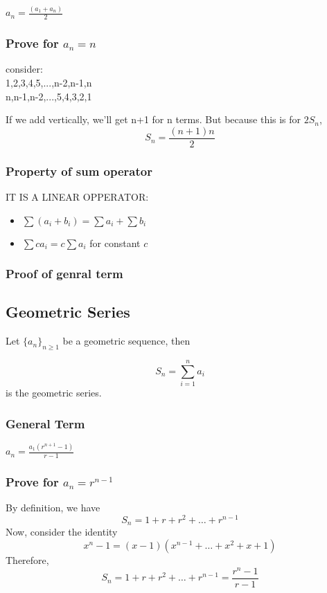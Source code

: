 \documentclass{article}
\begin{document}
$a_n = \frac{(a_1+a_n)}{2}$

\subsubsection{Prove for $a_n=n$}

consider:
\\
1,2,3,4,5,...,n-2,n-1,n\\
n,n-1,n-2,...,5,4,3,2,1

If we add vertically, we'll get n+1 for n terms.
But because this is for $2S_n$, $$S_n=\frac{(n+1)n}{2}$$

\subsubsection{Property of sum operator}

IT IS A LINEAR OPPERATOR:

\begin{itemize}
    \item $\sum (a_i+b_i) = \sum a_i + \sum b_i$
    \item $\sum ca_i = c \sum a_i$ for constant $c$
\end{itemize}

\subsubsection{Proof of genral term}
\newpage

\subsection{Geometric Series}

Let $\{a_n\}_{n\ge1}$ be a geometric sequence, then 

$$S_n=\sum_{i=1}^{n}a_i$$ 
is the geometric series.

\subsubsection{General Term}

$a_n = \frac{a_1(r^{n+1}-1)}{r-1}$

\subsubsection{Prove for $a_n=r^{n-1}$}
By definition, we have
$$S_n=1+r+r^2+\dots+r^{n-1}$$
Now, consider the identity $$x^n-1=(x-1)(x^{n-1}+\dots+x^2+x+1)$$
Therefore,
$$S_n=1+r+r^2+\dots+r^{n-1}=\frac{r^n-1}{r-1}$$
\end{document}
